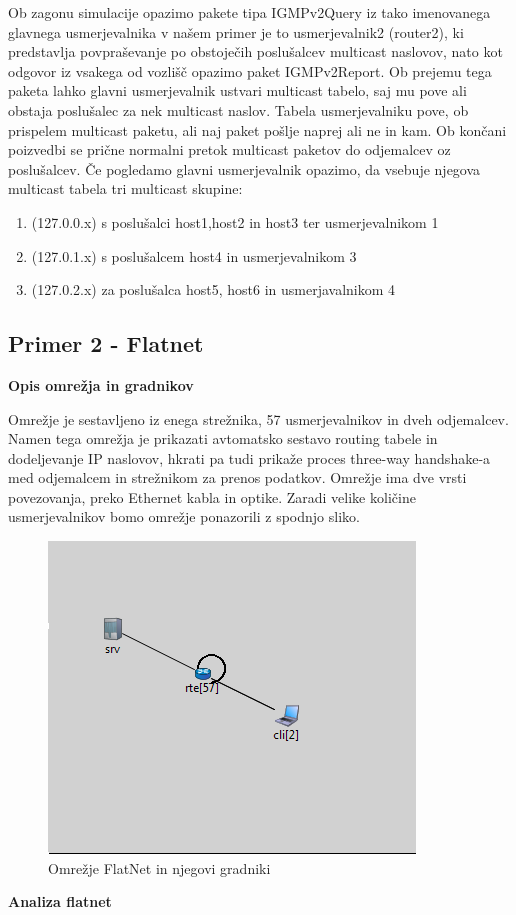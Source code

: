 \documentclass[11pt, a4paper, slovene]{book}
\begin{document}
Ob zagonu simulacije opazimo pakete tipa IGMPv2Query iz tako imenovanega glavnega usmerjevalnika v našem primer je to usmerjevalnik2 (router2), ki predstavlja povpraševanje po obstoječih poslušalcev multicast naslovov, nato kot odgovor iz vsakega od vozlišč opazimo paket IGMPv2Report. Ob prejemu tega paketa lahko glavni usmerjevalnik ustvari multicast tabelo, saj mu pove ali obstaja poslušalec za nek multicast naslov. Tabela usmerjevalniku pove, ob prispelem multicast paketu, ali naj paket pošlje naprej ali ne in kam. Ob končani poizvedbi se prične normalni pretok multicast paketov do odjemalcev oz poslušalcev. Če pogledamo glavni usmerjevalnik opazimo, da vsebuje njegova multicast tabela tri multicast skupine: 
\begin{enumerate}
	\item (127.0.0.x) s poslušalci host1,host2 in host3 ter usmerjevalnikom 1
	\item (127.0.1.x) s poslušalcem host4 in usmerjevalnikom 3
	\item (127.0.2.x) za poslušalca host5, host6 in usmerjavalnikom 4
\end{enumerate} 
\subsection{Primer 2 - Flatnet}
\large \bf Opis omrežja in gradnikov
\normalfont \normalsize 

Omrežje je sestavljeno iz enega strežnika, 57 usmerjevalnikov in dveh odjemalcev. Namen tega omrežja je prikazati avtomatsko sestavo routing tabele in dodeljevanje IP naslovov, hkrati pa tudi prikaže proces three-way handshake-a med odjemalcem in strežnikom za prenos podatkov. Omrežje ima dve vrsti povezovanja, preko Ethernet kabla in optike. Zaradi velike količine usmerjevalnikov bomo omrežje ponazorili z spodnjo sliko.
\begin{figure}[h]
	\centering
	\includegraphics{FlatNet.png}
	\caption{Omrežje FlatNet in njegovi gradniki}
	\label{flatNet}	
\end{figure}
\pagebreak
\large\bf Analiza flatnet
\normalfont \normalsize 
\end{document}
